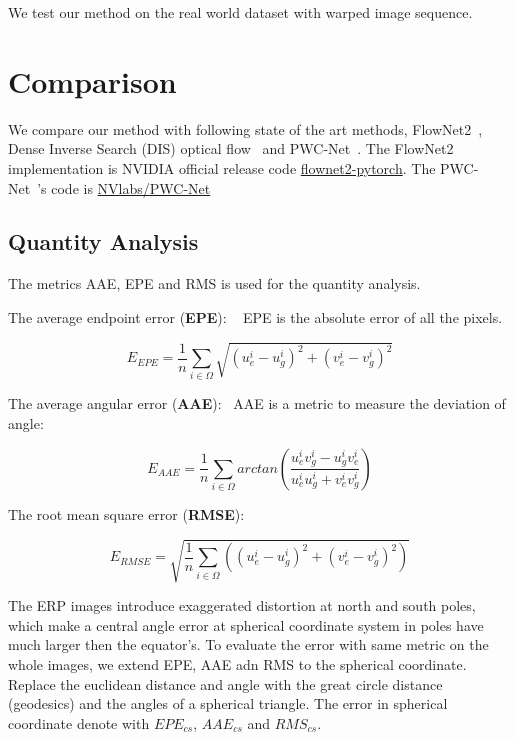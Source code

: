 We test our method on the real world dataset with warped image sequence.

\section{Comparison}

We compare our method with following state of the art methods, FlowNet2~\cite{ilg2017flownet}, Dense Inverse Search (DIS) optical flow~\cite{kroeger2016fast} and PWC-Net~\cite{sun2018pwc}. 
The FlowNet2~\cite{ilg2017flownet} implementation is NVIDIA official release code \href{https://github.com/NVIDIA/flownet2-pytorch}{flownet2-pytorch}.
The PWC-Net~\cite{sun2018pwc}'s code is \href{https://github.com/NVlabs/PWC-Net}{NVlabs/PWC-Net}

\subsection{Quantity Analysis}

The metrics AAE, EPE and RMS is used for the quantity analysis.

The average endpoint error (\textbf{EPE}):  ~\cite{??}
EPE is the absolute error of all the pixels. 

\begin{equation}\label{equ_exp_epe}
E_{EPE} = \frac{1}{n} \sum_{i \in \Omega}\sqrt{(u_e^i - u_g^i)^2 + (v_e^i - v_g^i)^2}
\end{equation}

The average angular error (\textbf{AAE}):~\cite{??}
AAE is a metric to measure the deviation of angle:

\begin{equation}\label{equ_exp_aae}
	E_{AAE} = \frac{1}{n} \sum_{i \in \Omega}arctan(\frac{u^i_e v^i_g - u^i_g v^i_e}{u^i_e u^i_g + v^i_e v^i_g})
\end{equation}

The root mean square error (\textbf{RMSE}):~\cite{??}

\begin{equation}\label{equ_exp_rmse}
	E_{RMSE} = \sqrt{\frac{1}{n} \sum_{i \in \Omega}((u_e^i - u_g^i)^2 + (v_e^i - v_g^i)^2)}
\end{equation}

The ERP images introduce exaggerated distortion at north and south poles, which make a central angle error at spherical coordinate system in poles have much larger then the equator's.
To evaluate the error with same metric on the whole images, we extend EPE, AAE adn RMS to the spherical coordinate. 
Replace the euclidean distance and angle with the great circle distance (geodesics) and the angles of a spherical triangle. 
The error in spherical coordinate denote with $EPE_{cs}$, $AAE_{cs}$ and $RMS_{cs}$.


